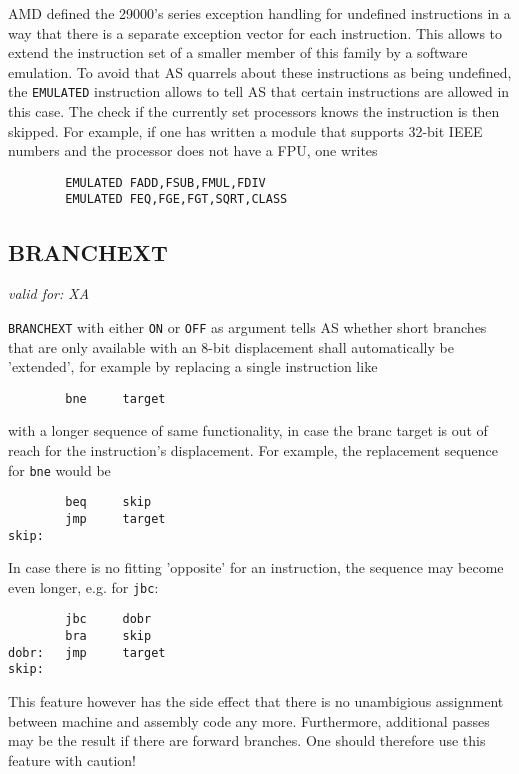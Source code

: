 \documentclass[12pt,twoside]{report}
\makeatletter
\newcommand{\tty}[1]{{\tt #1}}
\newcommand{\ttindex}[1]{\index{#1@{\tt #1}}}
\makeatother
\begin{document}
AMD defined the 29000's series exception handling for undefined
instructions in a way that there is a separate exception vector for
each instruction.  This allows to extend the instruction set of a
smaller member of this family by a software emulation.  To avoid that
AS quarrels about these instructions as being undefined, the
\tty{EMULATED} instruction allows to tell AS that certain instructions are
allowed in this case.  The check if the currently set processors knows the
instruction is then skipped.  For example, if one has written a module
that supports 32-bit IEEE numbers and the processor does not have a FPU,
one writes
\begin{verbatim}
        EMULATED FADD,FSUB,FMUL,FDIV
        EMULATED FEQ,FGE,FGT,SQRT,CLASS
\end{verbatim}


\subsection{BRANCHEXT}
\ttindex{BRANCHEXT}

{\em valid for: XA}

{\tt BRANCHEXT} with either \tty{ON} or \tty{OFF} as argument tells AS
whether short branches that are only available with an 8-bit displacement
shall automatically be 'extended', for example by replacing a single
instruction like
\begin{verbatim}
        bne     target
\end{verbatim}
with a longer sequence of same functionality, in case the branc target is
out of reach for the instruction's displacement.  For example, the
replacement sequence for {\tt bne} would be
\begin{verbatim}
        beq     skip  
        jmp     target
skip:
\end{verbatim}
In case there is no fitting 'opposite' for an instruction, the sequence
may become even longer, e.g. for {\tt jbc}:
\begin{verbatim}
        jbc     dobr
        bra     skip
dobr:   jmp     target
skip:
\end{verbatim}
This feature however has the side effect that there is no unambigious
assignment between machine and assembly code any more.  Furthermore,
additional passes may be the result if there are forward branches.  One
should therefore use this feature with caution!

\end{document}

